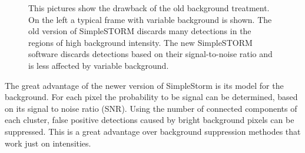\begin{figure}
\hfill
{}\hfill	
{}

\caption{This pictures show the drawback of the old background treatment. On the left a typical frame with variable background is shown. The old version of SimpleSTORM discards many detections in the regions of high background intensity. The new SimpleSTORM software discards detections based on their signal-to-noise ratio and is less affected by variable background.}
\label{bgmakesitbad}	

\end{figure}

The great advantage of the newer version of SimpleStorm is its model for the background. For each pixel the probability to be signal can be determined, based on its signal to noise ratio (SNR). Using the number of connected components of each cluster, false positive detections caused by bright background pixels can be suppressed. This is a great advantage over background suppression methodes that work just on intensities.

